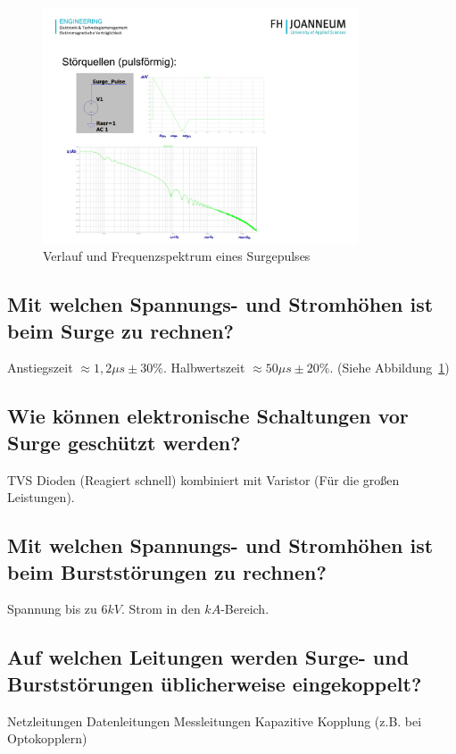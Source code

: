\begin{figure}[ht]
  \centering
  \includegraphics[height=7cm]{src/assets/pictures/lv4_surge_pulse.jpg}
  \caption{Verlauf und Frequenzspektrum eines Surgepulses}\label{fig:lv4:surge_puls}
\end{figure}

\subsection{Mit welchen Spannungs- und Stromhöhen ist beim Surge zu rechnen?}
Anstiegszeit \(\approx 1,2\mu s \pm 30\%\). Halbwertszeit \(\approx 50\mu s \pm 20\%\). (Siehe Abbildung~\ref{fig:lv4:surge_puls})

\subsection{Wie können elektronische Schaltungen vor Surge geschützt werden?}
TVS Dioden (Reagiert schnell) kombiniert mit Varistor (Für die großen Leistungen).

\subsection{Mit welchen Spannungs- und Stromhöhen ist beim Burststörungen zu rechnen?}
Spannung bis zu \(6kV\). Strom in den \(kA\)-Bereich.

\subsection{Auf welchen Leitungen werden Surge- und Burststörungen üblicherweise eingekoppelt?}
\begin{outline}
  \1 Netzleitungen
  \1 Datenleitungen
  \1 Messleitungen
  \1 Kapazitive Kopplung (z.B. bei Optokopplern)
\end{outline}

\pagebreak
